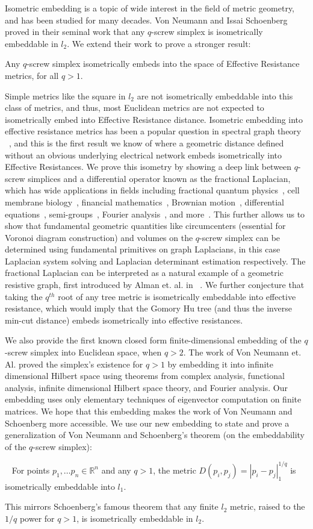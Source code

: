 Isometric embedding is a topic of wide interest in the field of metric
geometry, and has been studied for many decades. Von Neumann and Issai
Schoenberg proved in their seminal work that any $q$-screw simplex is
isometrically embeddable in $l_2$. We extend their work to prove a stronger
result: 
\begin{theorem}
Any $q$-screw simplex isometrically embeds into the space of
Effective Resistance metrics, for all $q>1$.
\end{theorem}
Simple metrics like the square in $l_2$ are
not isometrically embeddable into this class of metrics, and thus, most
Euclidean metrics are not expected to isometrically embed into Effective
Resistance distance. Isometric embedding into effective resistance metrics
has been a popular question in spectral graph theory ~\cite{}, and this is
the first result we know of where a geometric distance defined without an
obvious underlying electrical network embeds isometrically into Effective
Resistances. We prove this isometry by showing a deep link between
$q$-screw simplices and a differential operator known as the fractional
Laplacian, which has wide applications in fields including fractional
quantum physics~\cite{}, cell membrane biology~\cite{}, financial
mathematics~\cite{}, Brownian motion~\cite{}, differential
equations~\cite{}, semi-groups~\cite{}, Fourier analysis~\cite{}, and
more~\cite{}. This further allows us to show that fundamental geometric
quantities like circumcenters (essential for Voronoi diagram construction)
and volumes on the $q$-screw simplex can be determined using fundamental
primitives on graph Laplacians, in this case Laplacian system solving and
Laplacian determinant estimation respectively. The fractional Laplacian can
be interpreted as a natural example of a geometric resistive graph, first
introduced by Alman et. al. in ~\cite{}. We further conjecture that taking
the $q^{th}$ root of any tree metric is isometrically embeddable into
effective resistance, which would imply that the Gomory Hu tree (and thus
the inverse min-cut distance) embeds isometrically into effective
resistances.

We also provide the first known closed form finite-dimensional embedding of
the $q$-screw simplex into Euclidean space, when $q>2$. The work of Von
Neumann et. Al. proved the simplex's existence for $q>1$ by embedding it
into infinite dimensional Hilbert space using theorems from complex
analysis, functional analysis, infinite dimensional Hilbert space theory,
and Fourier analysis. Our embedding uses only elementary techniques of
eigenvector computation on finite matrices. We hope that this embedding
makes the work of Von Neumann and Schoenberg more accessible. We use our
new embedding to state and prove a generalization of Von Neumann and
Schoenberg’s theorem (on the embeddability of the $q$-screw simplex):

\begin{theorem}~\label{thm:l1} For points $p_1, \ldots p_n \in
\mathbb{R}^n$ and any $q > 1$, the metric $D(p_i, p_j) = |p_i-p_j|_1^{1/q}$
is isometrically embeddable into $l_1$.\end{theorem}
This mirrors
Schoenberg's famous theorem that any finite $l_2$ metric, raised to the
$1/q$ power for $q > 1$, is isometrically embeddable in $l_2$.
